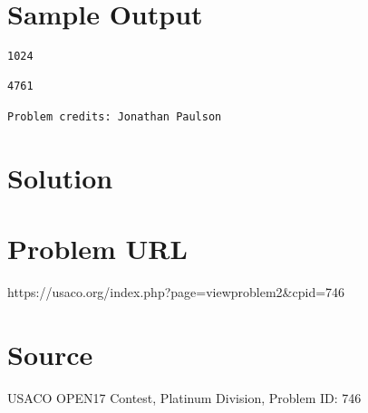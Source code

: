 \documentclass[12pt]{article}
\begin{document}
\section*{Sample Output}
\begin{verbatim}
1024

4761

Problem credits: Jonathan Paulson
\end{verbatim}

\section*{Solution}


\section*{Problem URL}
https://usaco.org/index.php?page=viewproblem2&cpid=746

\section*{Source}
USACO OPEN17 Contest, Platinum Division, Problem ID: 746
\end{document}
